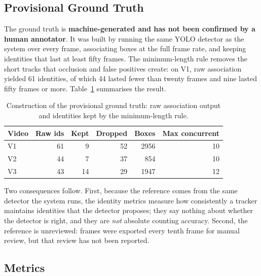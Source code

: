 \documentclass[11pt]{article}
\newif\ifnotes  \notesfalse
\newcommand{\authorcheck}[1]{\ifnotes{\color{red}\textbf{[Author check:} #1\textbf{]}}\fi}
\begin{document}
\subsection{Provisional Ground Truth}
\label{sec:gt}

The ground truth is \textbf{machine-generated and has not been confirmed by a human annotator}. It was built by running the same YOLO detector as the system over every frame, associating boxes at the full frame rate, and keeping identities that last at least fifty frames. The minimum-length rule removes the short tracks that occlusion and false positives create: on V1, raw association yielded 61 identities, of which 44 lasted fewer than twenty frames and nine lasted fifty frames or more. Table~\ref{tab:gt} summarises the result.

\begin{table}[htbp]
\centering
\small
\caption{Construction of the provisional ground truth: raw association output and identities kept by the minimum-length rule.}
\label{tab:gt}
\begin{tabular}{lrrrrr}
\toprule
\textbf{Video} & \textbf{Raw ids} & \textbf{Kept} & \textbf{Dropped} & \textbf{Boxes} & \textbf{Max concurrent} \\
\midrule
V1 & 61 & 9  & 52 & 2956 & 10 \\
V2 & 44 & 7  & 37 & 854  & 10 \\
V3 & 43 & 14 & 29 & 1947 & 12 \\
\bottomrule
\end{tabular}
\end{table}

Two consequences follow. First, because the reference comes from the same detector the system runs, the identity metrics measure how consistently a tracker maintains identities that the detector proposes; they say nothing about whether the detector is right, and they are \emph{not} absolute counting accuracy. Second, the reference is unreviewed: frames were exported every tenth frame for manual review, but that review has not been reported. \authorcheck{Table~\ref{tab:gt} lists a maximum concurrency of 10 for V1 and V2, which exceeds the 9 and 7 kept identities. Either concurrency was measured on unfiltered tracks or the retained identities under-count the visible fruit. The source's claim that the numbers are consistent with the concurrency bound is therefore not repeated here. Also state whether the detector's training or validation images overlap V1--V3.}

\subsection{Metrics}
\end{document}

